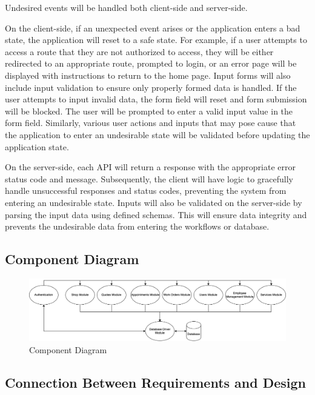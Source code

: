 \documentclass[12pt, titlepage]{article}
\begin{document}
Undesired events will be handled both client-side and server-side.

On the client-side, if an unexpected event arises or the application enters a bad state, the
application will reset to a safe state. For example, if a user attempts to access a route that they
are not authorized to access, they will be either redirected to an appropriate route, prompted to
login, or an error page will be displayed with instructions to return to the home page. Input forms
will also include input validation to ensure only properly formed data is handled. If the user
attempts to input invalid data, the form field will reset and form submission will be blocked. The
user will be prompted to enter a valid input value in the form field. Similarly, various user
actions and inputs that may pose cause that the application to enter an undesirable state will be
validated before updating the application state.

On the server-side, each API will return a response with the appropriate error status code and
message. Subsequently, the client will have logic to gracefully handle unsuccessful responses and
status codes, preventing the system from entering an undesirable state. Inputs will also be
validated on the server-side by parsing the input data using defined schemas. This will ensure data
integrity and prevents the undesirable data from entering the workflows or database.

\subsection{Component Diagram}

\begin{figure}[H]
	\centering
	\includegraphics[width=\textwidth]{component-diagram.png}
	\caption{Component Diagram}
	\label{ComponentDiagram}
\end{figure}

\subsection{Connection Between Requirements and Design} \label{SecConnection}
\end{document}
